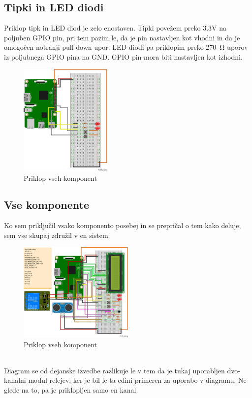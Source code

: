 \documentclass[11pt]{article}
\begin{document}
\subsection{Tipki in LED diodi}
Priklop tipk in LED diod je zelo enostaven. Tipki povežem preko 3.3V na poljuben GPIO pin, pri tem pazim le, da je pin nastavljen kot vhodni in da je omogočen notranji pull down upor.
LED diodi pa priklopim preko \SI{270}{\ohm} uporov iz poljubnega GPIO pina na GND. GPIO pin mora biti nastavljen kot izhodni.
\begin{figure}[h]
\centering
\includegraphics[width=0.4\textwidth]{images/smartGarage_LED_button_bb.png}
\caption{Priklop vseh komponent}
\end{figure}

\subsection{Vse komponente}
Ko sem priključil vsako komponento posebej in se prepričal o tem kako deluje, sem vse skupaj združil v en sistem.
\begin{figure}[h]
\centering
\includegraphics[width=0.5\textwidth]{images/smartGarageComplete_bb.png}
\caption{Priklop vseh komponent}
\end{figure}\\
Diagram se od dejanske izvedbe razlikuje le v tem da je tukaj uporabljen dvo-kanalni modul relejev, ker je bil le ta edini primeren za uporabo v diagramu. Ne glede na to, pa je priklopljen samo en kanal.
\end{document}
